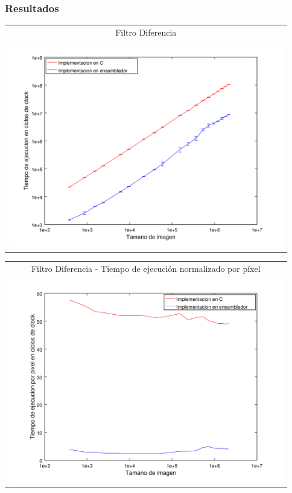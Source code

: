 		\subsubsection*{Resultados}
		   	{\centering \begin{tabular}{c}
		      {\small Filtro Diferencia} \\
		      \includegraphics[width=12cm]{../exp/graficos/exp1-diff-c_vs_asm.png} \\
		    \end{tabular}}

		    {\centering \begin{tabular}{c}
		      {\small Filtro Diferencia - Tiempo de ejecución normalizado por píxel} \\
		      \includegraphics[width=12cm]{../exp/graficos/exp1-diff-tiempo_por_pixel.png} \\
		    \end{tabular}}

